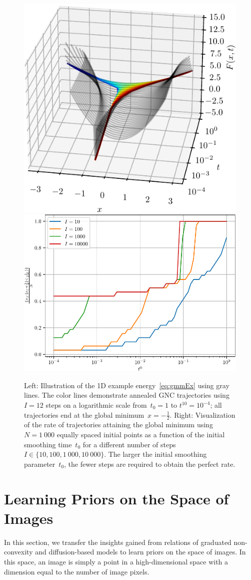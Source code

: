 \documentclass{article} %
\theoremstyle{plain}
\theoremstyle{definition}
\theoremstyle{remark}
\begin{document}
\begin{figure}[t]
\includegraphics[width=.45\linewidth]{figures/ex_gmm/ex_gmm_opt}\hfill
\includegraphics[width=.54\linewidth]{figures/ex_gmm/ex_gmm_acc}
\label{fig:gmmOptimization}
\caption{Left: Illustration of the 1D example energy~\eqref{eq:gmmEx} using gray lines. The color lines demonstrate annealed GNC trajectories using $I=12$ steps on a logarithmic scale from~$t_0=1$ to $t^{10}=10^{-4}$; all trajectories end at the global minimum~$x=-\frac12$.
Right: Visualization of the rate of trajectories attaining the global minimum using~$N=1\ 000$ equally spaced initial points as a function of the initial smoothing time~$t_0$ for a different number of steps~$I\in\{10,100,1\ 000,10\ 000\}$.
The larger the initial smoothing parameter~$t_0$, the fewer steps are required to obtain the perfect rate.
}
\end{figure}

\section{Learning Priors on the Space of Images}
In this section, we transfer the insights gained from relations of graduated non-convexity and diffusion-based models to learn priors on the space of images.
In this space, an image is simply a point in a high-dimensional space with a dimension equal to the number of image pixels.
\end{document}
